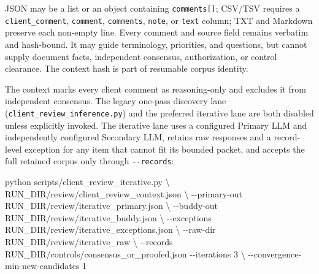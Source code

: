 \documentclass[
]{article}
\newenvironment{Shaded}{}{}
\newcommand{\AttributeTok}[1]{\textcolor[rgb]{0.49,0.56,0.16}{#1}}
\newcommand{\DataTypeTok}[1]{\textcolor[rgb]{0.56,0.13,0.00}{#1}}
\newcommand{\ExtensionTok}[1]{#1}
\newcommand{\NormalTok}[1]{#1}
\begin{document}
JSON may be a list or an object containing \texttt{comments{[}{]}};
CSV/TSV requires a \texttt{client\_\allowbreak{}comment},
\texttt{comment}, \texttt{comments}, \texttt{note}, or \texttt{text}
column; TXT and Markdown preserve each non-empty line. Every comment and
source field remains verbatim and hash-bound. It may guide terminology,
priorities, and questions, but cannot supply document facts, independent
consensus, authorization, or control clearance. The context hash is part
of resumable corpus identity.

The context marks every client comment as reasoning-only and excludes it
from independent consensus. The legacy one-pass discovery lane
(\texttt{client\_\allowbreak{}review\_\allowbreak{}inference.py}) and
the preferred iterative lane are both disabled unless explicitly
invoked. The iterative lane uses a configured Primary LLM and
independently configured Secondary LLM, retains raw responses and a
record-level exception for any item that cannot fit its bounded packet,
and accepts the full retained corpus only through \texttt{-\/-records}:

\begin{Shaded}
\begin{Highlighting}[]
\ExtensionTok{python}\NormalTok{ scripts/client\_review\_iterative.py }\DataTypeTok{\textbackslash{}}
\NormalTok{  RUN\_DIR/review/client\_review\_context.json }\DataTypeTok{\textbackslash{}}
  \AttributeTok{{-}{-}primary{-}out}\NormalTok{ RUN\_DIR/review/iterative\_primary.json }\DataTypeTok{\textbackslash{}}
  \AttributeTok{{-}{-}buddy{-}out}\NormalTok{ RUN\_DIR/review/iterative\_buddy.json }\DataTypeTok{\textbackslash{}}
  \AttributeTok{{-}{-}exceptions}\NormalTok{ RUN\_DIR/review/iterative\_exceptions.json }\DataTypeTok{\textbackslash{}}
  \AttributeTok{{-}{-}raw{-}dir}\NormalTok{ RUN\_DIR/review/iterative\_raw }\DataTypeTok{\textbackslash{}}
  \AttributeTok{{-}{-}records}\NormalTok{ RUN\_DIR/controls/consensus\_or\_proofed.json }\AttributeTok{{-}{-}iterations}\NormalTok{ 3 }\DataTypeTok{\textbackslash{}}
  \AttributeTok{{-}{-}convergence{-}min{-}new{-}candidates}\NormalTok{ 1}
\end{Highlighting}
\end{Shaded}
\end{document}

